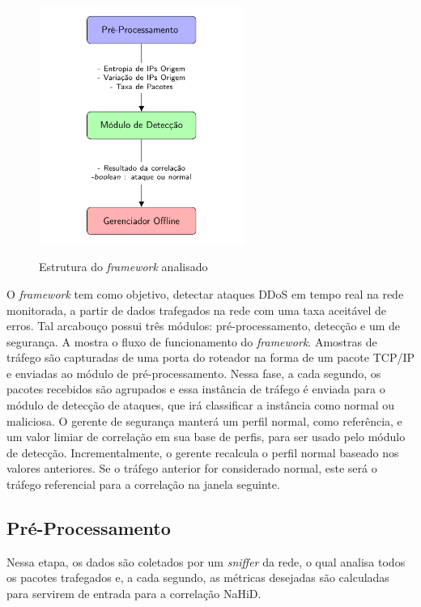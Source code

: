  \begin{figure}[htb]
	\centering
	\caption{Estrutura do \textit{framework} analisado }
	\includegraphics[width=0.6\textwidth]{figs/fluxoFramework.pdf}\\
	\label{fig:Fluxo_Framework}
\end{figure}

O \textit{framework} tem como objetivo, detectar ataques DDoS em tempo real na rede monitorada, a partir de dados trafegados na rede com uma taxa aceitável de erros. Tal arcabouço possui três módulos: pré-processamento, detecção e um de segurança. A  mostra o fluxo de funcionamento do \textit{framework}. Amostras de tráfego são capturadas de uma porta do roteador na forma de um pacote TCP/IP e enviadas ao módulo de pré-processamento. Nessa fase, a cada segundo, os pacotes recebidos são agrupados e essa instância de tráfego é enviada para o módulo de detecção de ataques, que irá classificar a instância como normal ou maliciosa. O gerente de segurança manterá um perfil normal, como referência, e um valor limiar de correlação em sua base de perfis, para ser usado pelo módulo de detecção. Incrementalmente, o gerente recalcula o perfil normal baseado nos valores anteriores. Se o tráfego anterior for considerado normal, este será o tráfego referencial para a correlação na janela seguinte.

\subsection{Pré-Processamento}
Nessa etapa, os dados são coletados por um \textit{sniffer} da rede, o qual analisa todos os pacotes trafegados e, a cada segundo, as métricas desejadas são calculadas para servirem de entrada para a correlação NaHiD. 
